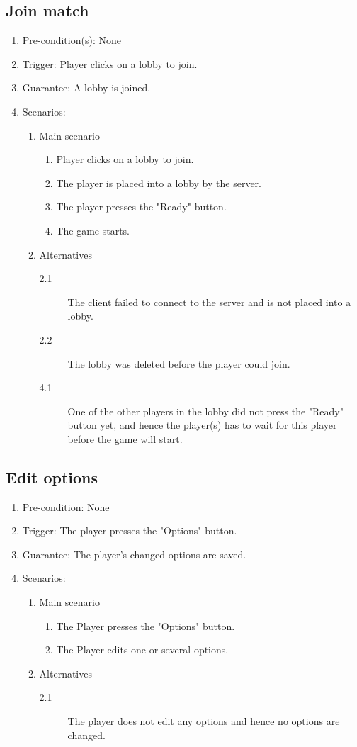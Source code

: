 \documentclass[a4paper,twoside,11pt]{article}
\begin{document}
\subsection*{Join match}
\begin{enumerate}
\item Pre-condition(s): None
\item Trigger: Player clicks on a lobby to join.
\item Guarantee: A lobby is joined.
\item Scenarios: 
	\begin{enumerate}
	\item Main scenario
		\begin{enumerate}[1)]
		\item Player clicks on a lobby to join.
		\item The player is placed into a lobby by the server.
		\item The player presses the "Ready" button.
		\item The game starts.
		\end{enumerate}
	\item Alternatives
		\begin{description}
		\item[2.1] The client failed to connect to the server and is 			not placed into a lobby.
		\item[2.2] The lobby was deleted before the player could join.
		\item[4.1] One of the other players in the lobby did not press 			the "Ready" button yet, and hence the player(s) has to wait for 			this player before the game will start.
		\end{description}
	\end{enumerate}
\end{enumerate}
\subsection*{Edit options}
\begin{enumerate}
\item Pre-condition: None
\item Trigger: The player presses the "Options" button.
\item Guarantee: The player's changed options are saved.
\item Scenarios: 
	\begin{enumerate}
	\item Main scenario
		\begin{enumerate}[1)]
		\item The Player presses the "Options" button.
		\item The Player edits one or several options.
		\end{enumerate}
	\item Alternatives
		\begin{description}
		\item[2.1] The player does not edit any options and hence no 			options are changed.
		\end{description}
	\end{enumerate}
\end{enumerate}
\end{document}
